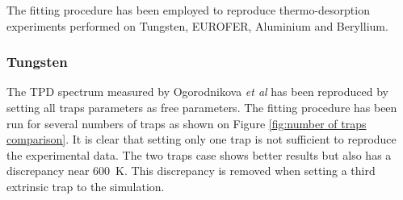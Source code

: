 

The fitting procedure has been employed to reproduce thermo-desorption experiments performed on Tungsten, EUROFER, Aluminium and Beryllium.


\subsubsection{Tungsten}

The TPD spectrum measured by Ogorodnikova \textit{et al}  has been reproduced by setting all traps parameters as free parameters.
The fitting procedure has been run for several numbers of traps as shown on Figure \ref{fig:number of traps comparison}.
It is clear that setting only one trap is not sufficient to reproduce the experimental data.
The two traps case shows better results but also has a discrepancy near \SI{600}{K}.
This discrepancy is removed when setting a third extrinsic trap to the simulation.

